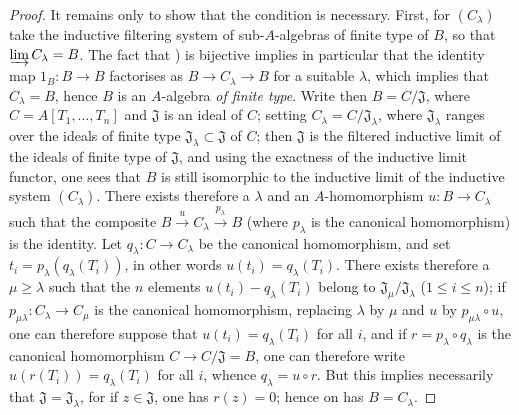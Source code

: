 \begin{proof}
It remains only to show that the condition is necessary.
First, for $(C_\lambda)$ take the inductive filtering system of sub-$A$-algebras of finite type of $B$, so that $\varinjlim C_\lambda=B$.
The fact that ) is bijective implies in particular that the identity map $1_B:B\to B$ factorises as $B\to C_\lambda\to B$ for a suitable $\lambda$, which implies that $C_\lambda=B$, hence $B$ is an $A$-algebra \emph{of finite type}.
Write then $B=C/\mathfrak{J}$, where $C=A[T_1,\ldots,T_n]$ and $\mathfrak{J}$ is an ideal of $C$; setting $C_\lambda=C/\mathfrak{J}_\lambda$, where $\mathfrak{J}_\lambda$ ranges over the ideals of finite type $\mathfrak{J}_\lambda\subset\mathfrak{J}$ of $C$; then $\mathfrak{J}$ is the filtered inductive limit of the ideals of finite type of $\mathfrak{J}$, and using the exactness of the inductive limit functor, one sees that $B$ is still isomorphic to the inductive limit of the inductive system $(C_\lambda)$.
There exists therefore a $\lambda$ and an $A$-homomorphism $u:B\to C_\lambda$ such that the composite $B\xrightarrow{u}C_\lambda\xrightarrow{p_\lambda}B$ (where $p_\lambda$ is the canonical homomorphism) is the identity.
Let $q_\lambda:C\to C_\lambda$ be the canonical homomorphism, and set $t_i=p_\lambda(q_\lambda(T_i))$, in other words $u(t_i)=q_\lambda(T_i)$.
There exists therefore a $\mu\geqslant\lambda$ such that the $n$ elements $u(t_i)-q_\lambda(T_i)$ belong to $\mathfrak{J}_\mu/\mathfrak{J}_\lambda$ ($1\leqslant i\leqslant n$); if $p_{\mu\lambda}:C_\lambda\to C_\mu$ is the canonical homomorphism, replacing $\lambda$ by $\mu$ and $u$ by $p_{\mu\lambda}\circ u$, one can therefore suppose that $u(t_i)=q_\lambda(T_i)$ for all $i$, and if $r=p_\lambda\circ q_\lambda$ is the canonical homomorphism $C\to C/\mathfrak{J}=B$, one can therefore write $u(r(T_i))=q_\lambda(T_i)$ for all $i$, whence $q_\lambda=u\circ r$.
But this implies necessarily that $\mathfrak{J}=\mathfrak{J}_\lambda$, for if $z\in\mathfrak{J}$, one has $r(z)=0$; hence on has $B=C_\lambda$.


\end{proof}
